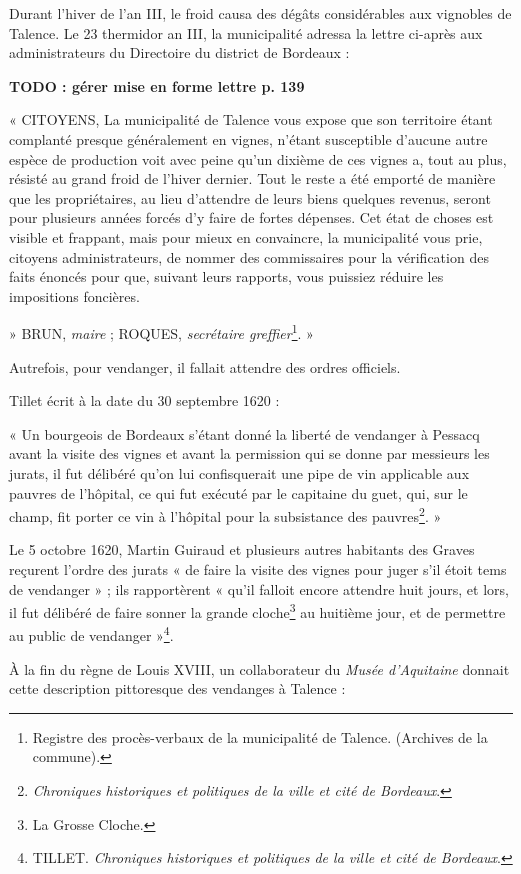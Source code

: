 \documentclass[a4paper,11pt]{book}
\begin{document}
Durant l'hiver de l'an III, le froid causa des dégâts considérables aux vignobles de Talence. Le 23 thermidor an III, la municipalité adressa la lettre ci-après aux administrateurs du Directoire du district de Bordeaux :

\textbf{TODO : gérer mise en forme lettre p. 139}

« CITOYENS,
La municipalité de Talence vous expose que son territoire étant complanté presque généralement en vignes, n'étant susceptible d'aucune autre espèce de production voit avec peine qu'un dixième de ces vignes a, tout au plus, résisté au grand froid de l'hiver dernier. Tout le reste a été emporté de manière que les propriétaires, au lieu d'attendre de leurs biens quelques revenus, seront pour plusieurs années forcés d'y faire de fortes dépenses. Cet état de choses est visible et frappant, mais pour mieux en convaincre, la municipalité vous prie, citoyens administrateurs, de nommer des commissaires pour la vérification des faits énoncés pour que, suivant leurs rapports, vous puissiez réduire les impositions foncières.

» BRUN, \textit{maire }; ROQUES, \textit{secrétaire greffier}\footnote{Registre des procès-verbaux de la municipalité de Talence. (Archives de la commune).}. »

Autrefois, pour vendanger, il fallait attendre des ordres officiels.

Tillet écrit à la date du 30 septembre 1620 :

« Un bourgeois de Bordeaux s'étant donné la liberté de vendanger à Pessacq avant la visite des vignes et avant la permission qui se donne par messieurs les jurats, il fut délibéré qu'on lui confisquerait une pipe de vin applicable aux pauvres de l'hôpital, ce qui fut exécuté par le capitaine du guet, qui, sur le champ, fit porter ce vin à l'hôpital pour la subsistance des pauvres\footnote{\textit{Chroniques historiques et politiques de la ville et cité de Bordeaux}.}. »

Le 5 octobre 1620, Martin Guiraud et plusieurs autres habitants des Graves reçurent l'ordre des jurats « de faire la visite des vignes pour juger s'il étoit tems de vendanger » ; ils rapportèrent « qu'il falloit encore attendre huit jours, et lors, il fut délibéré de faire sonner la grande cloche\footnote{La Grosse Cloche.} au huitième jour, et de permettre au public de vendanger »\footnote{TILLET. \textit{Chroniques historiques et politiques de la ville et cité de Bordeaux}.}.

À la fin du règne de Louis XVIII, un collaborateur du \textit{Musée d'Aquitaine} donnait cette description pittoresque des vendanges à Talence :
\end{document}
